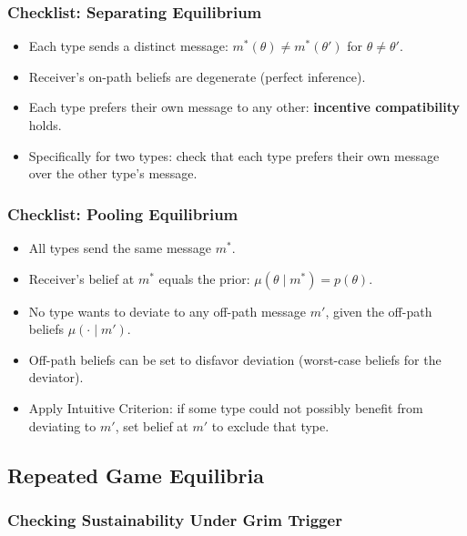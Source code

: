 \documentclass[hidelinks]{article}
\begin{document}
\subsubsection{Checklist: Separating Equilibrium}

\begin{itemize}
    \item Each type sends a distinct message: $m^*(\theta) \neq m^*(\theta')$ for $\theta \neq \theta'$.
    \item Receiver's on-path beliefs are degenerate (perfect inference).
    \item Each type prefers their own message to any other: \textbf{incentive compatibility} holds.
    \item Specifically for two types: check that each type prefers their own message over the other type's message.
\end{itemize}

\subsubsection{Checklist: Pooling Equilibrium}

\begin{itemize}
    \item All types send the same message $m^*$.
    \item Receiver's belief at $m^*$ equals the prior: $\mu(\theta \mid m^*) = p(\theta)$.
    \item No type wants to deviate to any off-path message $m'$, given the off-path beliefs $\mu(\cdot \mid m')$.
    \item Off-path beliefs can be set to disfavor deviation (worst-case beliefs for the deviator).
    \item Apply Intuitive Criterion: if some type could not possibly benefit from deviating to $m'$, set belief at $m'$ to exclude that type.
\end{itemize}

\subsection{Repeated Game Equilibria}

\subsubsection{Checking Sustainability Under Grim Trigger}
\end{document}
